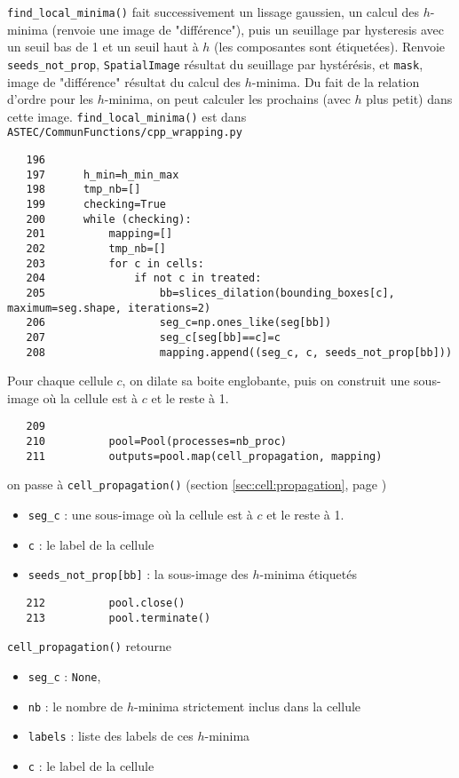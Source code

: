 \documentclass{article}
\def \mycolor {red}
\begin{document}
\color{\mycolor}
\texttt{find\_local\_minima()} fait successivement un lissage gaussien, un calcul des $h$-minima (renvoie une image de "diff\'erence"), puis un seuillage par hysteresis avec un seuil bas de 1 et un seuil haut \`a $h$ (les composantes sont \'etiquet\'ees).
Renvoie \verb|seeds_not_prop|, \texttt{SpatialImage} r\'esultat du seuillage par hyst\'er\'esis, et \verb|mask|, image de "diff\'erence" r\'esultat du calcul des $h$-minima. Du fait de la relation d'ordre pour les $h$-minima, on peut calculer les prochains (avec $h$ plus petit) dans cette image.
\texttt{find\_local\_minima()} est dans \texttt{ASTEC/CommunFunctions/cpp\_wrapping.py}
\color{black}
\begin{verbatim}  
   196	
   197	    h_min=h_min_max
   198	    tmp_nb=[]
   199	    checking=True
   200	    while (checking):
   201	        mapping=[]
   202	        tmp_nb=[]
   203	        for c in cells:
   204	            if not c in treated:
   205	                bb=slices_dilation(bounding_boxes[c], maximum=seg.shape, iterations=2)
   206	                seg_c=np.ones_like(seg[bb])
   207	                seg_c[seg[bb]==c]=c
   208	                mapping.append((seg_c, c, seeds_not_prop[bb]))
\end{verbatim} 
\color{\mycolor}
Pour chaque cellule $c$, on dilate sa boite englobante, puis on construit une sous-image o\`u la cellule est \`a $c$ et le reste \`a 1.
\color{black}
\begin{verbatim}  
   209	
   210	        pool=Pool(processes=nb_proc)
   211	        outputs=pool.map(cell_propagation, mapping)
\end{verbatim} 
\color{\mycolor}
on passe \`a \texttt{cell\_propagation()} (section \ref{sec:cell:propagation}, page \pageref{sec:cell:propagation})
\begin{itemize}
\itemsep -0.5ex
\item \verb|seg_c| : une sous-image o\`u la cellule est \`a $c$ et le reste \`a 1.
\item \verb|c| : le label de la cellule
\item \verb|seeds_not_prop[bb]| : la sous-image des $h$-minima \'etiquet\'es
\end{itemize}
\color{black}
\begin{verbatim}  
   212	        pool.close()
   213	        pool.terminate()
\end{verbatim} 
\color{\mycolor}
\texttt{cell\_propagation()} retourne
\begin{itemize}
\itemsep -0.5ex
\item \verb|seg_c| : \texttt{None},
\item \verb|nb| : le nombre de $h$-minima strictement inclus dans la cellule
\item \verb|labels| : liste des labels de ces $h$-minima
\item \verb|c| : le label de la cellule
\end{itemize}
\end{document}
